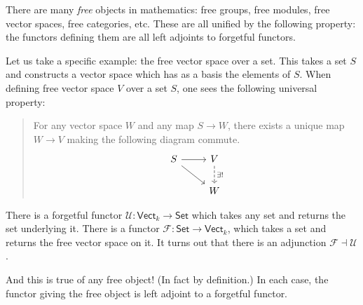 \documentclass[notes.tex]{subfiles}
\begin{document}
\begin{example}
  \label{eg:freeforgetfuladjunctions}
  There are many \emph{free} objects in mathematics: free groups, free modules, free vector spaces, free categories, etc. These are all unified by the following property: the functors defining them are all left adjoints to forgetful functors.

  Let us take a specific example: the free vector space over a set. This takes a set $S$ and constructs a vector space which has as a basis the elements of $S$. When defining free vector space $V$ over a set $S$, one sees the following universal property:
  \begin{quote}
    For any vector space $W$ and any map $S \to W$, there exists a unique map $W \to V$ making the following diagram commute.
    \begin{equation*}
      \begin{tikzcd}
        S
        \arrow[r]
        \arrow[dr]
        & V
        \arrow[d, dashed, "\exists!"]
        \\
        & W
      \end{tikzcd}
    \end{equation*}
  \end{quote}

  There is a forgetful functor $\mathcal{U}\colon \mathsf{Vect}_{k} \rightarrow \mathsf{Set}$ which takes any set and returns the set underlying it. There is a functor $\mathcal{F}\colon \mathsf{Set} \rightarrow \mathsf{Vect}_{k}$, which takes a set and returns the free vector space on it. It turns out that there is an adjunction $\mathcal{F} \dashv \mathcal{U}$.

  And this is true of any free object! (In fact by definition.) In each case, the functor giving the free object is left adjoint to a forgetful functor.
\end{example}
\end{document}
